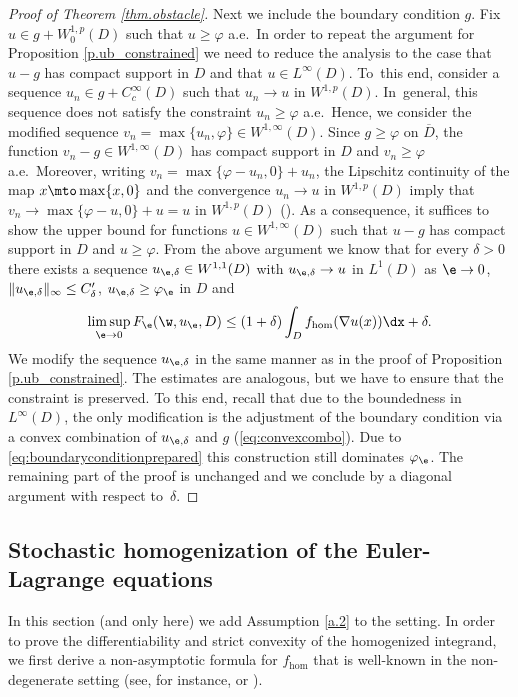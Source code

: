 \begin{proof}[Proof of Theorem \ref{thm.obstacle}]
Next we include the boundary condition $g$. Fix $u\in g+W^{1,p}_0(D)$ such that $ u\geq\varphi$ a.e.\ In order to repeat the argument for Proposition \ref{p.ub_constrained} we need to reduce the analysis to the case that $u-g$ has compact support in $D$ and that $u\in L^{\infty}(D)$. To~this end, consider a sequence $u_n\in g+C_c^{\infty}(D)$ such that $u_n\to u$ in $W^{1,p}(D)$. In~general, this sequence does not satisfy the constraint $u_n\geq\varphi$ a.e.\ Hence, we consider the modified sequence $v_n=\max\{u_n,\varphi\}\in W^{1,\infty}(D)$. Since $g\geq\varphi$ on $\overline{D}$, the function $v_n-g\in W^{1,\infty}(D)$ has compact support in $D$ and $v_n\geq\varphi$ a.e.\ Moreover, writing $v_n=\max\{\varphi-u_n,0\}+u_n$, the Lipschitz continuity of the map $x\mto \max\{x,0\}$ and the convergence $u_n\to u$ in $W^{1,p}(D)$ imply that $v_n\to \max\{\varphi-u,0\}+u=u$ in $W^{1,p}(D)$ (\cf \cite[Th.\,1]{MM}). As a consequence, it suffices to show the upper bound for functions $u\in W^{1,\infty}(D)$ such that $u-g$ has compact support in $D$ and $u\geq\varphi$. From the above argument we know that for every $\delta>0$ there exists a sequence $u_{\e,\delta}\in W^{1,1}(D)$ with $u_{\e,\delta}\to u$ in $L^1(D)$ as $\e\to 0$, $\|u_{\e,\delta}\|_{\infty}\leq C'_\delta$, $u_{\e,\delta}\geq \varphi_{\e}$ in $D$ and
\begin{equation*}
\limsup_{\e\to 0}F_{\e}(\w,u_{\e},D)\leq(1+\delta)\int_D f_{\hom}(\nabla u(x))\dx+\delta.
\end{equation*}
We modify the sequence $u_{\e,\delta}$ in the same manner as in the proof of Proposition \ref{p.ub_constrained}. The estimates are analogous, but we have to ensure that the constraint is preserved. To this end, recall that due to the boundedness in $L^{\infty}(D)$, the only modification is the adjustment of the boundary condition via a convex combination of $u_{\e,\delta}$ and $g$ (\cf \eqref{eq:convexcombo}). Due to \eqref{eq:boundaryconditionprepared} this construction still dominates $\varphi_{\e}$. The remaining part of the proof is unchanged and we conclude by a diagonal argument with respect to~$\delta$.
\end{proof}

\subsection{Stochastic homogenization of the Euler-Lagrange equations}
In this section (and only here) we add Assumption \ref{a.2} to the setting. In order to prove the differentiability and strict convexity of the homogenized integrand, we first derive a non-asymptotic formula for $f_{\hom}$ that is well-known in the non-degenerate setting (see, for instance, \cite[Chap.\,15]{JKO} or \cite[Lem.\,3.7]{DG_unbounded}).

